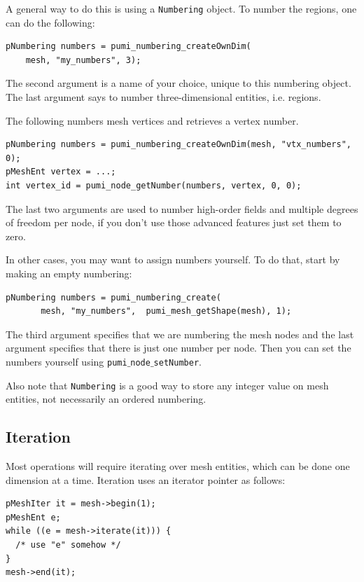 \documentclass{article}
\begin{document}
A general way to do this is using a \texttt{Numbering} object.
To number the regions, one can do the following:

\begin{lstlisting}
pNumbering numbers = pumi_numbering_createOwnDim(
    mesh, "my_numbers", 3);
\end{lstlisting}

The second argument is a name of your choice, unique to this numbering object.
The last argument says to number three-dimensional entities, i.e. regions.

The following numbers mesh vertices and retrieves a vertex number.

\begin{lstlisting}
pNumbering numbers = pumi_numbering_createOwnDim(mesh, "vtx_numbers", 0);
pMeshEnt vertex = ...;
int vertex_id = pumi_node_getNumber(numbers, vertex, 0, 0);
\end{lstlisting}

The last two arguments are used to number high-order fields and
multiple degrees of freedom per node, if you don't use those
advanced features just set them to zero.

In other cases, you may want to assign numbers yourself.
To do that, start by making an empty numbering:

\begin{lstlisting}
pNumbering numbers = pumi_numbering_create(
       mesh, "my_numbers",  pumi_mesh_getShape(mesh), 1);
\end{lstlisting}

The third argument specifies that we are numbering the mesh
nodes and the last argument specifies that there is just one
number per node. 
Then you can set the numbers yourself using \texttt{pumi$\_$node$\_$setNumber}.

Also note that \texttt{Numbering} is a good way to store
any integer value on mesh entities, not necessarily an
ordered numbering.

\subsection{Iteration}

Most operations will require iterating over mesh entities,
which can be done one dimension at a time.
Iteration uses an iterator pointer as follows:

\begin{lstlisting}
pMeshIter it = mesh->begin(1);
pMeshEnt e;
while ((e = mesh->iterate(it))) {
  /* use "e" somehow */
}
mesh->end(it);
\end{lstlisting}
\end{document}
